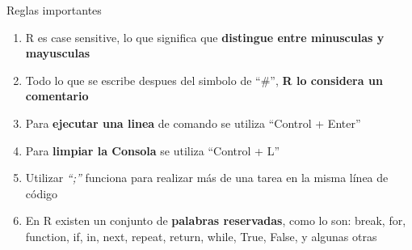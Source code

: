\documentclass[
  10,
  ignorenonframetext,
]{beamer}
\providecommand{\tightlist}{%
  \setlength{\itemsep}{0pt}\setlength{\parskip}{0pt}}
\begin{document}
\begin{frame}{Reglas importantes}
\protect\hypertarget{reglas-importantes}{}
\begin{enumerate}
\tightlist
\item
  R es case sensitive, lo que significa que \textbf{distingue entre
  minusculas y mayusculas}
\item
  Todo lo que se escribe despues del simbolo de ``\#'', \textbf{R lo
  considera un comentario}
\item
  Para \textbf{ejecutar una linea} de comando se utiliza ``Control +
  Enter''
\item
  Para \textbf{limpiar la Consola} se utiliza ``Control + L''
\item
  Utilizar \emph{``;''} funciona para realizar más de una tarea en la
  misma línea de código
\item
  En R existen un conjunto de \textbf{palabras reservadas}, como lo son:
  break, for, function, if, in, next, repeat, return, while, True,
  False, y algunas otras
\end{enumerate}
\end{frame}
\end{document}
